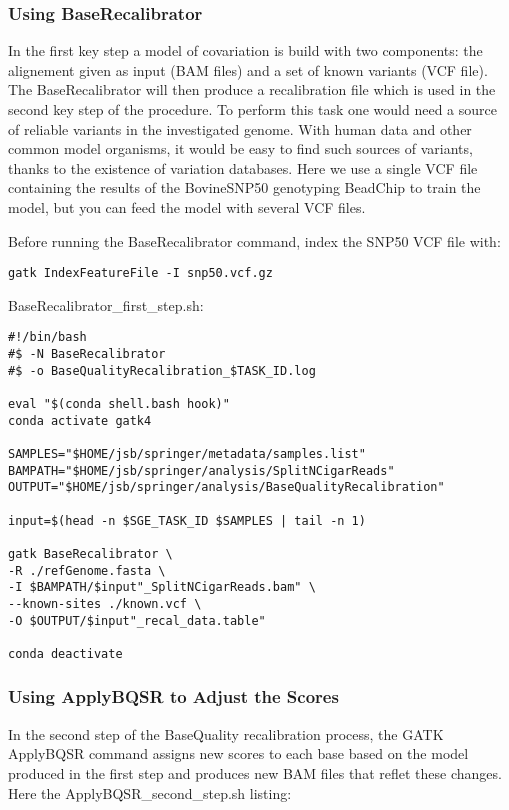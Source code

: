 \subsubsection{Using BaseRecalibrator}

In the first key step  a model of covariation is build with two components: the alignement given as input (BAM files) and a set of known variants (VCF file). The BaseRecalibrator will then produce a recalibration file which is used in the second key step of the procedure. To perform this task one would need a source of reliable variants in the investigated genome. With human data and other common model organisms, it would be easy to find such sources of variants, thanks to the existence of variation databases. Here we use a single VCF file containing the results of the BovineSNP50 genotyping BeadChip to train the model, but you can feed the model with several VCF files.

Before running the BaseRecalibrator command, index the SNP50 VCF file with:

\begin{verbatim}
gatk IndexFeatureFile -I snp50.vcf.gz
\end{verbatim}


\noindent BaseRecalibrator\_first\_step.sh:
\begin{verbatim}
#!/bin/bash
#$ -N BaseRecalibrator
#$ -o BaseQualityRecalibration_$TASK_ID.log

eval "$(conda shell.bash hook)"
conda activate gatk4

SAMPLES="$HOME/jsb/springer/metadata/samples.list"
BAMPATH="$HOME/jsb/springer/analysis/SplitNCigarReads"
OUTPUT="$HOME/jsb/springer/analysis/BaseQualityRecalibration"

input=$(head -n $SGE_TASK_ID $SAMPLES | tail -n 1)

gatk BaseRecalibrator \
-R ./refGenome.fasta \
-I $BAMPATH/$input"_SplitNCigarReads.bam" \
--known-sites ./known.vcf \
-O $OUTPUT/$input"_recal_data.table"

conda deactivate
\end{verbatim}





\subsubsection{Using ApplyBQSR to Adjust the Scores}

In the second step of the BaseQuality recalibration process, the GATK ApplyBQSR command assigns new scores to each base based on the model produced in the first step and produces new BAM files that reflet these changes. Here the ApplyBQSR\_second\_step.sh listing:

